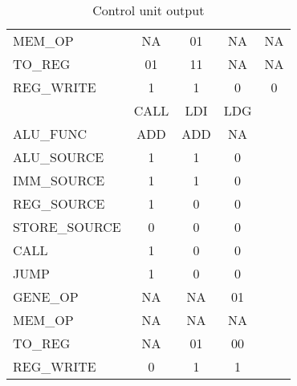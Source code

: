 \begin{table}
\begin{tabular}{| l | c | c | c |c |}
    MEM\_OP           &  NA          &  01      &  NA    &  NA        \\
    TO\_REG           &  01          &  11      &  NA    &  NA        \\
    REG\_WRITE        &  1           &  1       &  0     &  0         \\ 
    \hline
                      & CALL         & LDI      & LDG   &             \\
    \hline  
    ALU\_FUNC         & ADD          & ADD      &  NA   &             \\
    ALU\_SOURCE       &  1           &  1       &  0    &             \\
    IMM\_SOURCE       &  1           &  1       &  0    &             \\
    REG\_SOURCE       &  1           &  0       &  0    &             \\
    STORE\_SOURCE     &  0           &  0       &  0    &             \\
    CALL              &  1           &  0       &  0    &             \\
    JUMP              &  1           &  0       &  0    &             \\
    GENE\_OP          &  NA          &  NA      &  01   &             \\
    MEM\_OP           &  NA          &  NA      &  NA   &             \\
    TO\_REG           &  NA          &  01      &  00   &             \\   
    REG\_WRITE        &  0           &  1       &  1    &             \\
    \hline
    \end{tabular}
    \caption{Control unit output}
    \label{fpga:fitness:control_unit_out_tbl}

\end{table}

